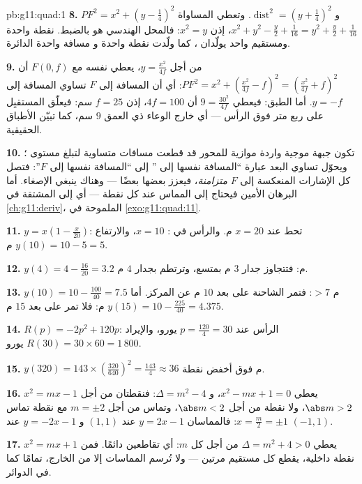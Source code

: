 \begin{solution}{pb:g11:quad:1}
\textbf{8.} $PF^2 = x^2 + \left(y - \frac14\right)^2$ و
$\operatorname{dist}^2 = \left(y + \frac14\right)^2$. وتعطي المساواة
$x^2 + y^2 - \frac y2 + \frac{1}{16} = y^2 + \frac y2 +
\frac1{16}$، إذن $x^2 = y$: فالمحل الهندسي هو  بالضبط.
نقطة واحدة ومستقيم واحد يولّدان ، كما ولّدت نقطة واحدة و
مسافة واحدة الدائرة.

\textbf{9.} من أجل $y = \frac{x^2}{4f}$، يعطي  نفسه مع
$F(0, f)$ أن $PF^2 = x^2 + \left(\frac{x^2}{4f} - f\right)^2
= \left(\frac{x^2}{4f} + f\right)^2$: أي أن المسافة إلى $F$ تساوي
المسافة إلى $y = -f$. أما الطبق: فيعطي $9 = \frac{30^2}{4f}$
أن $4f = 100$، إذن $f = 25$ سم: فيعلّق المستقبِل على ربع متر
فوق الرأس --- أي خارج الوعاء ذي العمق $9$ سم، كما تبيّن الأطباق
الحقيقية.

\textbf{10.} تكون جبهة موجية واردة موازية للمحور قد
قطعت مسافات متساوية لتبلغ مستوى ؛
ويحوّل تساوي البعد عبارة ``المسافة نفسها إلى '' إلى
``المسافة نفسها إلى $F$'': فتصل كل الإشارات المنعكسة إلى
$F$ \emph{متزامنة}، فيعزز بعضها بعضًا --- وهناك ينبغي الإصغاء.
أما البرهان الأمين فيحتاج إلى  المماس عند كل نقطة ---
أي إلى المشتقة في \cref{ch:g11:deriv}، الملموحة في
\cref{exo:g11:quad:11}.

\textbf{11.} $y = x\left(1 - \frac{x}{20}\right)$: تحط عند
$x = 20$ م. والرأس في : $x = 10$، والارتفاع
$y(10) = 10 - 5 = 5$ م.

\textbf{12.} $y(4) = 4 - \frac{16}{20} = 3.2$ م: فتتجاوز جدار $3$ م
بمتسع، وترتطم بجدار $4$ م.

\textbf{13.} $y(10) = 10 - \frac{100}{40} = 7.5$ م $> 7$: فتمر
الشاحنة على بعد $10$ م عن المركز. أما $y(15) = 10 - \frac{225}{40}
= 4.375$ م: فلا تمر على بعد $15$ م.

\textbf{14.} $R(p) = -2p^2 + 120p$: الرأس عند
$p = \frac{120}{4} = 30$ يورو، والإيراد
$R(30) = 30 \times 60 = 1\,800$ يورو.

\textbf{15.} $y(320) = 143 \times \left(\frac{320}{640}\right)^2
= \frac{143}{4} \approx 36$ م فوق أخفض نقطة.

\textbf{16.} $x^2 = mx - 1$ يعطي $x^2 - mx + 1 = 0$، و
$\Delta = m^2 - 4$: فنقطتان من أجل $\abs m > 2$، ولا نقطة من أجل
$\abs m < 2$، وتماس من أجل $m = \pm 2$ مع نقطة تماس
$x = \frac m2 = \pm 1$: فالمماسان $y = 2x - 1$ عند $(1, 1)$ و
$y = -2x - 1$ عند $(-1, 1)$.

\textbf{17.} $x^2 = mx + 1$ يعطي $\Delta = m^2 + 4 > 0$ من أجل
كل $m$: أي تقاطعين دائمًا. فمن نقطة داخلية،
يقطع كل مستقيم  مرتين --- ولا تُرسم المماسات إلا
من الخارج، تمامًا كما في الدوائر.


\end{solution}
